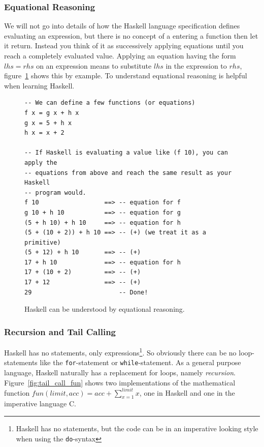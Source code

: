 \subsubsection{Equational Reasoning}

We will not go into details of how the Haskell language specification
defines evaluating an expression, but there is no concept of a
entering a function then let it return. Instead you think of it
as successively applying equations until you reach a completely
evaluated value. Applying an equation having the form $lhs = rhs$ on an
expression means to substitute $lhs$ in the expression to $rhs$, figure~\ref{fig:equational_reasioning} shows this by example.
To understand equational reasoning is helpful when learning Haskell.

\begin{figure}
\begin{mdframed}
  \begin{verbatim}
-- We can define a few functions (or equations)
f x = g x + h x
g x = 5 + h x
h x = x + 2

-- If Haskell is evaluating a value like (f 10), you can apply the
-- equations from above and reach the same result as your Haskell
-- program would.
f 10                  ==> -- equation for f
g 10 + h 10           ==> -- equation for g
(5 + h 10) + h 10     ==> -- equation for h
(5 + (10 + 2)) + h 10 ==> -- (+) (we treat it as a primitive)
(5 + 12) + h 10       ==> -- (+)
17 + h 10             ==> -- equation for h
17 + (10 + 2)         ==> -- (+)
17 + 12               ==> -- (+)
29                        -- Done!
  \end{verbatim}
  \caption{Haskell can be understood by equational reasoning.}
  \label{fig:equational_reasioning}
\end{mdframed}
\end{figure}

\subsubsection{Recursion and Tail Calling}

Haskell has no statements, only expressions\footnote{Haskell has no statements,
  but the code can be in an imperative looking style when using the
  \texttt{do}-syntax}. So obviously there
can be no loop-statements like the \texttt{for}-statement or
\texttt{while}-statement. As a general purpose language,
Haskell naturally has a replacement for loops, namely \emph{recursion}. Figure~\ref{fig:tail_call_fun} shows two implementations of the mathematical
function $ fun(limit, acc) = acc + \sum_{x=1}^{limit}{x} $, one in
Haskell and one in the imperative language C.

